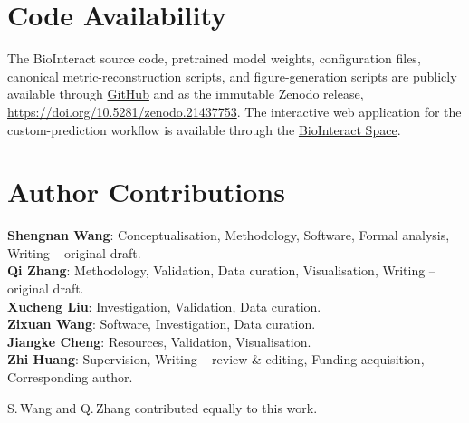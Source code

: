 \documentclass[fleqn,10pt]{wlscirep}
\begin{document}
\section*{Code Availability}

The BioInteract source code, pretrained model weights, configuration files,
canonical metric-reconstruction scripts, and figure-generation scripts are
publicly available through \href{https://github.com/Liubo-520/bio-intelligence}{GitHub} and
as the immutable Zenodo release, \url{https://doi.org/10.5281/zenodo.21437753}.
The interactive web
application for the custom-prediction workflow is available through the
\href{https://huggingface.co/spaces/AI4deeperScience/BioInteract}{BioInteract Space}.

\section*{Author Contributions}

\textbf{Shengnan Wang}: Conceptualisation, Methodology, Software, Formal
analysis, Writing -- original draft. \\
\textbf{Qi Zhang}: Methodology, Validation, Data curation, Visualisation,
Writing -- original draft. \\
\textbf{Xucheng Liu}: Investigation, Validation, Data curation. \\
\textbf{Zixuan Wang}: Software, Investigation, Data curation. \\
\textbf{Jiangke Cheng}: Resources, Validation, Visualisation. \\
\textbf{Zhi Huang}: Supervision, Writing -- review \& editing, Funding
acquisition, Corresponding author.

\vspace{0.5em}
\noindent S.\,Wang and Q.\,Zhang contributed equally to this work.

\end{document}
